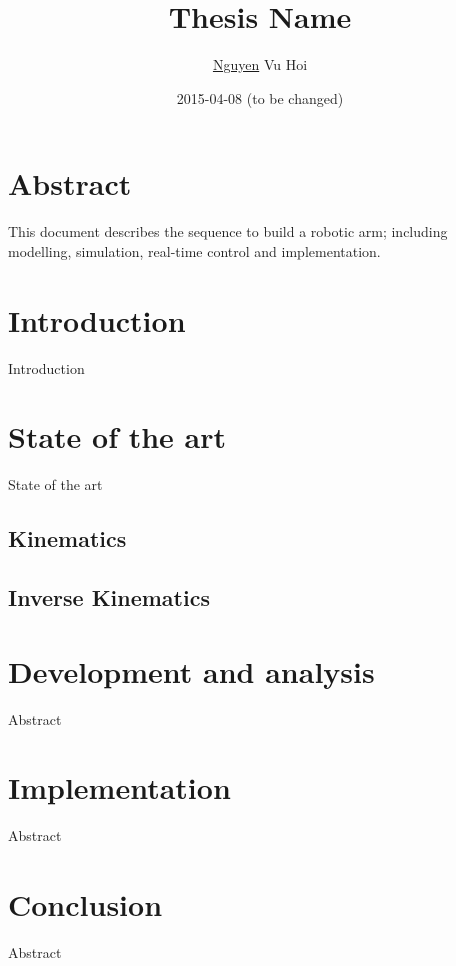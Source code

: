 \documentclass{article}
\title{\textbf{Thesis Name}}
\date{2015-04-08 (to be changed)}
\author{\underline{Nguyen} Vu Hoi}
\begin{document}
  \centering
  \maketitle
{}
  
  \newpage
  \tableofcontents
  \listoffigures
  
  \newpage
  
  \section{Abstract}
  This document describes the sequence to build a robotic arm; including modelling, simulation, real-time control and implementation.
  
  \newpage
  
  \section{Introduction}
  Introduction
  
  \newpage
  \section{State of the art}
  State of the art
  
  \newpage
  \subsection{Kinematics}
  
  \newpage
  \subsection{Inverse Kinematics}
  
  \newpage
  \section{Development and analysis}
  Abstract
  
  \newpage
  \section{Implementation}
  Abstract
  
  \newpage
  \section{Conclusion}
  Abstract
  
\end{document}
